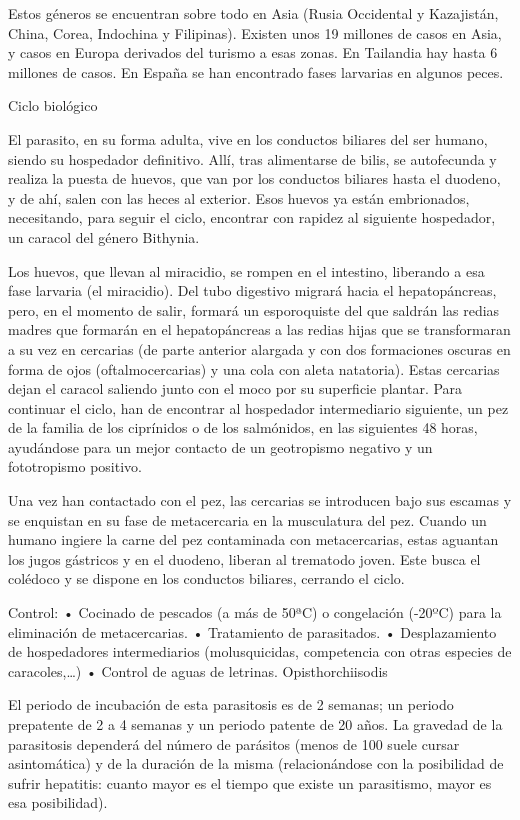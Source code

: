 Estos géneros se encuentran sobre todo en Asia (Rusia Occidental y Kazajistán, China, Corea, Indochina y Filipinas). Existen unos 19 millones de casos en Asia, y casos en Europa derivados del turismo a esas zonas. En Tailandia hay hasta 6 millones de casos. En España se han encontrado fases larvarias en algunos peces.

Ciclo biológico

El parasito, en su forma adulta, vive en los conductos biliares del ser humano, siendo su hospedador definitivo. Allí, tras alimentarse de bilis, se autofecunda y realiza la puesta de huevos, que van por los conductos biliares hasta el duodeno, y de ahí, salen con las heces al exterior. Esos huevos ya están embrionados, necesitando, para seguir el ciclo, encontrar con rapidez al siguiente hospedador, un caracol del género Bithynia.

Los huevos, que llevan al miracidio, se rompen en el intestino, liberando a esa fase larvaria (el miracidio). Del tubo digestivo migrará hacia el hepatopáncreas, pero, en el momento de salir, formará un esporoquiste del que saldrán las redias madres que formarán en el hepatopáncreas a las redias hijas que se transformaran a su vez en cercarias (de parte anterior alargada y con dos formaciones oscuras en forma de ojos (oftalmocercarias) y una cola con aleta natatoria). Estas cercarias dejan el caracol saliendo junto con el moco por su superficie plantar. Para continuar el ciclo, han de encontrar al hospedador intermediario siguiente, un pez de la familia de los ciprínidos o de los salmónidos, en las siguientes 48 horas, ayudándose para un mejor contacto de un geotropismo negativo y un fototropismo positivo.

Una vez han contactado con el pez, las cercarias se introducen bajo sus escamas y se enquistan en su fase de metacercaria en la musculatura del pez. Cuando un humano ingiere la carne del pez contaminada con metacercarias, estas aguantan los jugos gástricos y en el duodeno, liberan al trematodo joven. Este busca el colédoco y se dispone en los conductos biliares, cerrando el ciclo.

Control:
• Cocinado de pescados (a más de 50ªC) o congelación (-20ºC) para la eliminación de metacercarias.
• Tratamiento de parasitados.
• Desplazamiento de hospedadores intermediarios (molusquicidas, competencia con otras especies de caracoles,…)
• Control de aguas de letrinas.
Opisthorchiisodis

El periodo de incubación de esta parasitosis es de 2 semanas; un periodo prepatente de 2 a 4 semanas y un periodo patente de 20 años. La gravedad de la parasitosis dependerá del número de parásitos (menos de 100 suele cursar asintomática) y de la duración de la misma (relacionándose con la posibilidad de sufrir hepatitis: cuanto mayor es el tiempo que existe un parasitismo, mayor es esa posibilidad).

